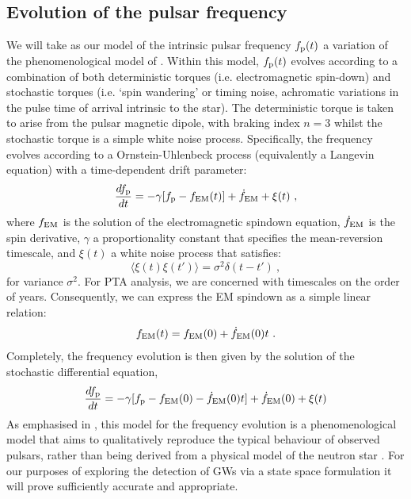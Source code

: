 \documentclass[fleqn,usenatbib,useAMS]{mnras}
\begin{document}
\subsection{Evolution of the pulsar frequency} \label{sec:psr_frequency}
We will take as our model of the intrinsic pulsar frequency $f_{\rm p}(t)$ a variation of the phenomenological model of \cite{Vargas}. Within this model, $f_{\rm p}(t)$ evolves according to a combination of both deterministic torques (i.e. electromagnetic spin-down) and stochastic torques (i.e. `spin wandering' or timing noise, achromatic variations in the pulse time of arrival intrinsic to the star). The deterministic torque is taken to arise from the pulsar magnetic dipole, with braking index $n=3$ whilst the stochastic torque is a simple white noise process. Specifically, the frequency evolves according to a Ornstein-Uhlenbeck process (equivalently a Langevin equation) with a time-dependent drift parameter:
\begin{equation}
	\frac{df_{\rm p}}{dt} = -\gamma	 [f_{\rm p} - f_{\rm EM} (t)] + \dot{f}_{\rm EM} + \xi(t) \ , 
	\label{eq:frequency_evolution}
\end{equation}
where $f_{\rm EM}$ is the solution of the electromagnetic spindown equation, $\dot{f}_{\rm EM}$ is the spin derivative, $\gamma$ a proportionality constant that specifies the mean-reversion timescale, and $\xi(t)$ a white noise process that satisfies:
\begin{equation}
	\langle \xi(t) \xi(t') \rangle = \sigma^2 \delta(t - t') \ ,
\end{equation}
for variance $\sigma^2$. For PTA analysis, we are concerned with timescales on the order of years. Consequently, we can express the EM spindown as a simple linear relation:
\begin{equation}
	f_{\rm EM} (t) = f_{\rm EM}(0) + \dot{f}_{\rm EM} (0)t \ .
\end{equation}  
Completely, the frequency evolution is then given by the solution of the stochastic differential equation,
\begin{equation}
	\frac{df_{\rm p}}{dt} = -\gamma	 [f_{\rm p}- f_{\rm EM}(0) - \dot{f}_{\rm EM} (0)t] + \dot{f}_{\rm EM} (0) + \xi(t)
	\label{eq:frequency_evolution_expanded}
\end{equation}
As emphasised in \cite{Vargas}, this model for the frequency evolution is a phenomenological model that aims to qualitatively reproduce the typical behaviour of observed pulsars, rather than being derived from a physical model of the neutron star \citep[e.g. a model of the neutron star crust and superfluid components][]{Meyers2021}. For our purposes of exploring the detection of GWs via a state space formulation it will prove sufficiently accurate and appropriate.
\end{document}
